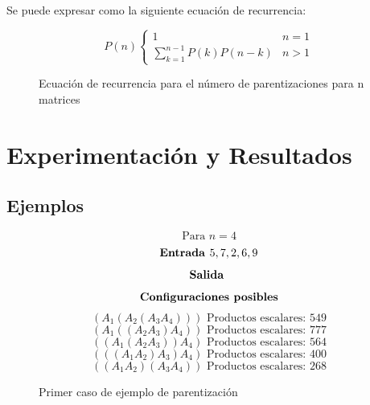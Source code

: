 \documentclass[12pt,twoside]{article}
\begin{document}
Se puede expresar como la siguiente ecuaci\'on de recurrencia:

\begin{figure}[ht]
    \centering
    \[
        P(n)
        \begin{cases}
            1 & n=1 \\
            \sum_{k=1}^{n-1} P(k)P(n-k) & n>1
        \end{cases}
    \]
    \caption{Ecuaci\'on de recurrencia para el n\'umero de parentizaciones para n matrices}
    \label{eq:recurrencia_p}
\end{figure}

\newpage
\vfill
\clearpage

\section{Experimentaci\'on y Resultados}
\subsection{Ejemplos}
\begin{figure}[ht]
    \centering
    \begin{equation*}
        \text{Para } n=4
    \end{equation*}
    \begin{equation*}
        \text{\textbf{Entrada }} 5,7,2,6,9
    \end{equation*}
    \begin{equation*}
        \text{\textbf{Salida }}
    \end{equation*}
    \begin{equation*}
        \text{\textbf{Configuraciones posibles}}
    \end{equation*}
    \begin{equation*}
        (A_1(A_2(A_3A_4))) \text{  Productos escalares: } 549 
    \end{equation*}
    \begin{equation*}
        (A_1((A_2A_3)A_4)) \text{  Productos escalares: }777
    \end{equation*}
    \begin{equation*}
        ((A_1(A_2A_3))A_4) \text{  Productos escalares: }564
    \end{equation*}
    \begin{equation*}
        (((A_1A_2)A_3)A_4) \text{  Productos escalares: }400
    \end{equation*}
    \begin{equation*}
        ((A_1A_2)(A_3A_4)) \text{  Productos escalares: }268
    \end{equation*}
    \caption{Primer caso de ejemplo de parentizaci\'on}
    \label{eq:primer_ejemplo}
\end{figure}
\end{document}
